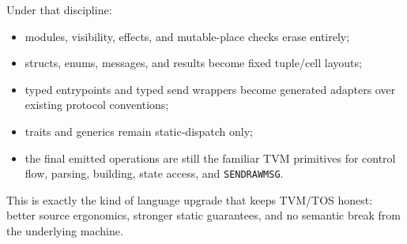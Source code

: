 \documentclass[12pt,oneside]{article}
\begin{document}
Under that discipline:

\begin{itemize}
\item modules, visibility, effects, and mutable-place checks erase entirely;
\item structs, enums, messages, and results become fixed tuple/cell layouts;
\item typed entrypoints and typed send wrappers become generated adapters over
existing protocol conventions;
\item traits and generics remain static-dispatch only;
\item the final emitted operations are still the familiar TVM primitives for
control flow, parsing, building, state access, and \verb|SENDRAWMSG|.
\end{itemize}

This is exactly the kind of language upgrade that keeps TVM/TOS honest:
better source ergonomics, stronger static guarantees, and no semantic break
from the underlying machine.
\end{document}
